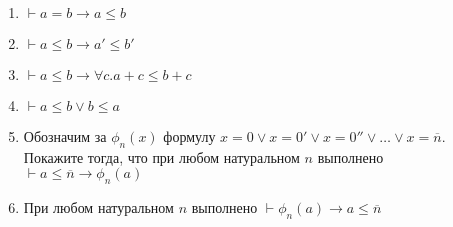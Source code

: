 \documentclass[10pt,a4paper,oneside]{article}
\begin{document}
\begin{enumerate}
\begin{enumerate}
\item $\vdash a = b \rightarrow a \le b$
\item $\vdash a \le b \rightarrow a' \le b'$
\item $\vdash a \le b \rightarrow \forall c.a + c \le b + c$
\item $\vdash a \le b \vee b \le a$
\item Обозначим за $\phi_n(x)$ формулу $x = 0 \vee x = 0' \vee x = 0'' \vee \dots \vee x = \overline{n}$.
Покажите тогда, что при любом натуральном $n$ выполнено $\vdash a \le \overline{n} \rightarrow \phi_n(a)$
\item При любом натуральном $n$ выполнено $\vdash \phi_n(a) \rightarrow a \le \overline{n}$
\end{enumerate}
\end{enumerate}
\end{document}
